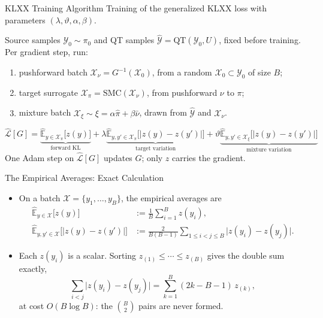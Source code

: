 \documentclass{beamer}
\newcommand{\red}{\color{red!80!black}}
\newcommand{\Le}{\leqslant}
\begin{document}
\begin{frame}{KLXX Training Algorithm}
	\small
	Training of the generalized KLXX loss with parameters $(\lambda,\vartheta,\alpha,\beta)$.
	\begin{tcolorbox}[colback=gray!8,colframe=gray!45,boxrule=0.5pt,arc=2pt,
		left=6pt,right=6pt,top=5pt,bottom=5pt]
		Source samples $\mathcal Y_0\sim\pi_0$ and QT samples $\hat{\mathcal Y}=\mathrm{QT}(\mathcal Y_0,U)$, fixed before training.\\[4pt]
		Per gradient step, run:
		\begin{enumerate}
			\setlength{\itemsep}{3pt}
			\item pushforward batch $\mathcal X_\nu = G^{-1}(\mathcal X_0)$, from a random $\mathcal X_0\subset\mathcal Y_0$ of size $B$;
			\item target surrogate $\mathcal X_\pi = \mathrm{SMC}(\mathcal X_\nu)$, from pushforward $\nu$ to $\pi$;
			\item mixture batch $\mathcal X_\xi \sim \xi = \alpha\hat\pi + \beta\bar\nu$, drawn from $\hat{\mathcal Y}$ and $\mathcal X_\nu$.
		\end{enumerate}
		\vspace{2pt}
		\begin{equation*}
			\widehat{\mathcal L}[G]=\underbrace{\widehat{\mathbb E}_{y\in\mathcal X_\pi}\bigl[z(y)\bigr]}_{\text{forward KL}} +
			\lambda\underbrace{\widehat{\mathbb E}_{y,y'\in\mathcal X_\pi}\bigl[|z(y)-z(y')|\bigr]}_{\text{target variation}}
			+\vartheta\underbrace{\widehat{\mathbb E}_{y,y'\in\mathcal X_{\xi}}\bigl[|z(y)-z(y')|\bigr]}_{\text{mixture variation}}
		\end{equation*}
		One Adam step on $\widehat{\mathcal L}[G]$ updates $G$; only $z$ carries the gradient.
	\end{tcolorbox}
\end{frame}


\begin{frame}{The Empirical Averages: Exact Calculation}
	\small
	\begin{itemize}
		\setlength{\itemsep}{5pt}
		\item On a batch $\mathcal X = \{y_1,\dots,y_B\}$, the empirical averages are
		\begin{align*}
			\widehat{\mathbb E}_{y\in\mathcal X}\bigl[z(y)\bigr]
			&:= \frac1B \sum_{i=1}^{B} z(y_i) ,
			\\[4pt]
			\widehat{\mathbb E}_{y,y'\in\mathcal X}\bigl[|z(y)-z(y')|\bigr]
			&:= \frac{2}{B(B-1)}\sum_{1\Le i<j\Le B} \bigl|z(y_i)-z(y_j)\bigr| .
		\end{align*}
		\item Each $z(y_i)$ is a scalar. Sorting $z_{(1)}\Le\cdots\Le z_{(B)}$ gives the double sum exactly,
		\begin{equation*}
			\sum_{i<j}\bigl|z(y_i)-z(y_j)\bigr| = \sum_{k=1}^{B}(2k-B-1)\,z_{(k)} ,
		\end{equation*}
		at cost {\red $O(B\log B)$}: the $\binom B2$ pairs are never formed.
	\end{itemize}
\end{frame}
\end{document}
